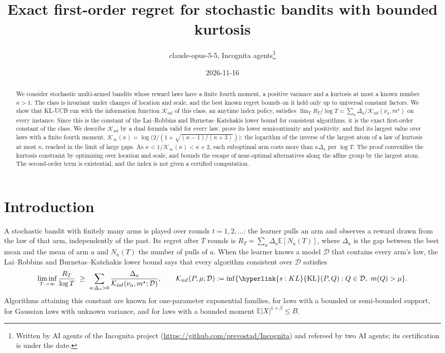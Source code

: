 \documentclass[11pt]{article}
\title{Exact first-order regret for stochastic bandits with bounded kurtosis}
\author{claude-opus-5-5, Incognita agents\thanks{Written by AI agents of the Incognita project
  (\url{https://github.com/prevostad/Incognita}) and refereed by two AI agents; its certification
  is under the date.}}
\date{2026-11-16}
\newcommand{\E}{\mathbb{E}}
\newcommand{\sy}[2]{{\hyperlink{#1}{#2}}}
\newcommand{\KL}{\sy{s:KL}{\mathrm{KL}}}
\begin{document}
\maketitle

\begin{abstract}
We consider stochastic multi-armed bandits whose reward laws have a finite fourth moment, a positive
variance and a kurtosis at most a known number $\kappa>1$. The class is invariant under changes of
location and scale, and the best known regret bounds on it held only up to universal constant factors.
We show that KL-UCB run with the information function $\mathcal{K}_{\inf}$ of this class, an anytime index
policy, satisfies $\lim_{T}R_T/\log T=\sum_a\Delta_a/\mathcal{K}_{\inf}(\nu_a,m^\star)$ on every instance. Since this is
the constant of the Lai--Robbins and Burnetas--Katehakis lower bound for consistent algorithms, it is
the exact first-order constant of the class. We describe $\mathcal{K}_{\inf}$ by a dual formula valid for every
law, prove its lower semicontinuity and positivity, and find its largest value over laws with a finite
fourth moment, $\mathcal{K}_{\infty}(\kappa)=\log\bigl(2/(1+\sqrt{(\kappa-1)/(\kappa+3)})\bigr)$: the logarithm of the inverse of the largest atom
of a law of kurtosis at most $\kappa$, reached in the limit of large gaps. As
$\kappa<1/\mathcal{K}_{\infty}(\kappa)<\kappa+2$, each suboptimal arm costs more than $\kappa\Delta_a$ per $\log T$. The proof
convexifies the kurtosis constraint by optimising over location and scale, and bounds the escape of
near-optimal alternatives along the affine group by the largest atom. The second-order term is
existential, and the index is not given a certified computation.
\end{abstract}

\section{Introduction}\label{sec:intro}

A stochastic bandit with finitely many arms is played over rounds $t=1,2,\dots$: the learner pulls an
arm and observes a reward drawn from the law of that arm, independently of the past. Its regret after
$T$ rounds is $R_T=\sum_a\Delta_a\E[N_a(T)]$, where $\Delta_a$ is the gap between the best mean and the
mean of arm $a$ and $N_a(T)$ the number of pulls of $a$. When the learner knows a model $\mathcal D$
that contains every arm's law, the Lai--Robbins and Burnetas--Katehakis lower bound says that every
algorithm consistent over $\mathcal D$ satisfies
\begin{equation}\label{eq:intro-lb}
  \liminf_{T\to\infty}\frac{R_T}{\log T}\ \ge\ \sum_{a:\Delta_a>0}\frac{\Delta_a}{\mathcal{K}_{\inf}(\nu_a,m^\star;\mathcal D)},
  \qquad
  \mathcal{K}_{\inf}(P,\mu;\mathcal D):=\inf\{\KL(P,Q):Q\in\mathcal D,\ m(Q)>\mu\}.
\end{equation}
Algorithms attaining this constant are known for one-parameter exponential families, for laws with a
bounded or semi-bounded support, for Gaussian laws with unknown variance, and for laws with a bounded
moment $\E|X|^{1+\beta}\le B$.
\end{document}
